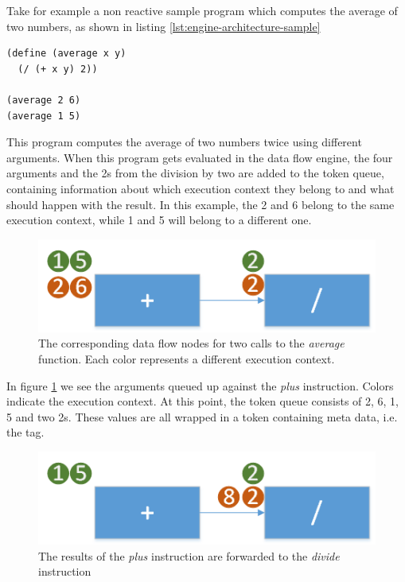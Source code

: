 Take for example a non reactive sample program which computes the average of two numbers, as shown in listing \ref{lst:engine-architecture-sample}

\begin{lstlisting}[caption={Computing the average of two numbers},captionpos=b,label={lst:engine-architecture-sample},language=FrDataFlow]
(define (average x y)
  (/ (+ x y) 2))
  
(average 2 6)
(average 1 5)
\end{lstlisting}

This program computes the average of two numbers twice using different arguments. When this program gets evaluated in the data flow engine, the four arguments and the 2s from the division by two are added to the token queue, containing information about which execution context they belong to and what should happen with the result. 
In this example, the 2 and 6 belong to the same execution context, while 1 and 5 will belong to a different one. 

\begin{figure}[h!]
	\includegraphics[width=\textwidth]{images/Engine-Architecture-1.png}
	\caption{The corresponding data flow nodes for two calls to the \textit{average} function. Each color represents a different execution context.}
	\label{fig:engine-architecture-1}
\end{figure}

In figure \ref{fig:engine-architecture-1} we see the arguments queued up against the \textit{plus} instruction. Colors indicate the execution context. At this point, the token queue consists of 2, 6, 1, 5 and two 2s. These values are all wrapped in a token containing meta data, i.e. the tag. 

\begin{figure}[h!]
	\includegraphics[width=\textwidth]{images/Engine-Architecture-2.png}
	\caption{The results of the \textit{plus} instruction are forwarded to the \textit{divide} instruction}
	\label{fig:engine-architecture-2}
\end{figure}

